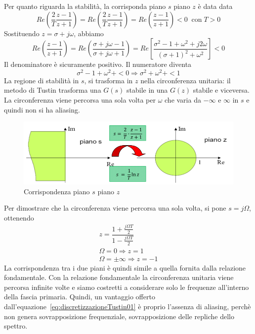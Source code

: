 \documentclass[a4paper]{report}
\begin{document}
Per quanto riguarda la stabilit\`a, la corrisponda piano $s$ piano $z$
\`e data data
\[
Re \left( \dfrac{2}{T}\dfrac{z - 1}{z + 1} \right) = Re \left(
\dfrac{2}{T}\dfrac{z - 1}{z + 1} \right) = Re \left( \dfrac{z - 1}{z +
  1}\right) < 0 \;\;\textrm{con}\; T > 0
\]
Sostituendo $z = \sigma + j \omega$, abbiamo
\[
 Re \left( \dfrac{z - 1}{z + 1}\right) = Re\left( \dfrac{\sigma + j
   \omega -1}{\sigma + j \omega + 1}\right) = Re \left[
   \dfrac{\sigma^2 - 1 + \omega^2 + j2\omega}{(\sigma + 1)^2 +
     \omega^2}\right] < 0
\]
Il denominatore \`e sicuramente positivo. Il numeratore diventa
\[
\sigma^2 - 1 + \omega^2 + < 0 \Rightarrow \sigma^2 + \omega^2 + < 1  
\]
La regione di stabilit\`a in $s$, si trasforma in $z$ nella
circonferenza unitaria: il metodo di Tustin trasforma una $G(s)$
stabile in una $G(z)$ stabile e viceversa. La circonferenza viene
percorsa una sola volta per $\omega$ che varia da $- \infty$ e
$\infty$ in $s$ e quindi non si ha aliasing.
\begin{figure}[!h]
  \begin{center}
    \includegraphics[scale=0.4]{./figures/discretizzazioneTustin01.png}
    \caption{Corrispondenza piano $s$ piano
      $z$}\label{fig:discretizzazioneTustin01} 
  \end{center}
\end{figure}

Per dimostrare che la circonferenza viene percorsa una sola volta, si
pone $s = j\Omega$, ottenendo
\[
\begin{array}{l}
  z = \dfrac{1 + \frac{j \Omega T}{2}}{1 - \frac{j \Omega T}{2}}\\
  \Omega = 0 \Rightarrow z = 1\\
  \Omega = \pm \infty \Rightarrow z = -1
\end{array}
\]
La corrispondenza tra i due piani \`e quindi simile a quella fornita
dalla relazione fondamentale. Con la relazione fondamentale la
circonferenza unitaria viene percorsa infinite volte e siamo costretti
a considerare solo le frequenze all'interno della fascia
primaria. Quindi, un vantaggio offerto
dall'equazione~\ref{eq:discretizzazioneTustin01} \`e proprio l'assenza
di aliasing, perch\`e non genera sovrapposizione frequenziale,
sovrapposizione delle repliche dello spettro. 
\end{document}
